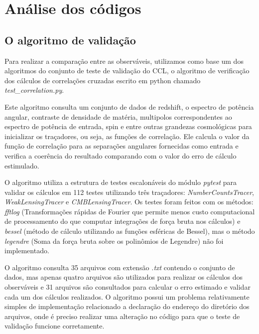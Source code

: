	\chapter*{Análise dos códigos}

\section*{O algoritmo de validação}

Para realizar a comparação entre as observáveis, utilizamos como base um dos algoritmos do conjunto de teste de validação do CCL, o algoritmo de verificação dos cálculos de correlações cruzadas escrito em python chamado  \textit{test\_correlation.py}.

Este algoritmo consulta um conjunto de dados de redshift, o espectro de potência angular, contraste de densidade de matéria, multipolos correspondentes ao espectro de potência de entrada, spin e entre outras grandezas cosmológicas para inicializar os traçadores, ou seja, as funções de correlação. Ele calcula o valor da função de correlação para as separações angulares fornecidas como entrada e verifica a coerência do resultado comparando com o valor do erro de cálculo estimulado.

O algoritmo utiliza a estrutura de testes escalonáveis do módulo \textit{pytest} para validar os cálculos em 112 testes utilizando três traçadores:  \textit{NumberCountsTracer}, \textit{WeakLensingTracer} e \textit{CMBLensingTracer}. Os testes foram feitos com os métodos: \textit{fftlog} (Transformações rápidas de Fourier que permite menos custo computacional de processamento do que computar integrações de força bruta nos cálculos) e \textit{bessel} (método de cálculo utilizando as funções esféricas de Bessel), mas o método \textit{legendre} (Soma da força bruta sobre os polinômios de Legendre) não foi implementado.

O algoritmo consulta 35 arquivos com extensão \textit{.txt} contendo o conjunto de dados, mas apenas quatro arquivos são utilizados para realizar os cálculos dos observáveis e 31 arquivos são consultados para calcular o erro estimado e validar cada um dos cálculos realizados. O algoritmo possui um problema relativamente simples de implementação relacionado a declaração do endereço do diretório dos arquivos, onde é preciso realizar uma alteração no código para que o teste de validação funcione corretamente. 


